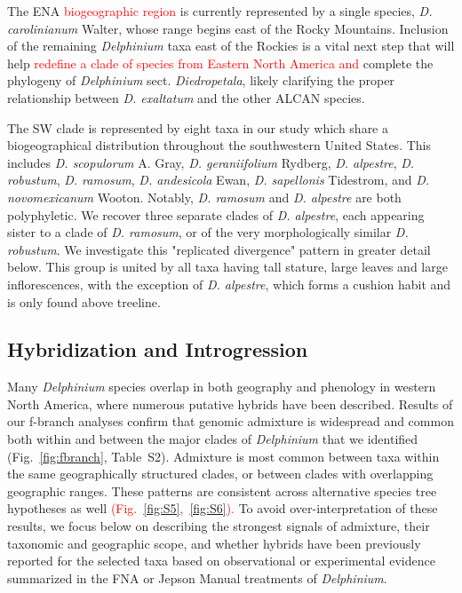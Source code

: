 \documentclass[11pt]{article}
\begin{document}
The ENA \textcolor{red}{biogeographic region} is currently represented by a single species, \emph{D. carolinianum} Walter, whose range begins east of the Rocky Mountains. Inclusion of the remaining \emph{Delphinium} taxa east of the Rockies is a vital next step that will help \textcolor{red}{redefine a clade of species from Eastern North America and} complete the phylogeny of \emph{Delphinium} sect. \emph{Diedropetala}, likely clarifying the proper relationship between \emph{D. exaltatum} and the other ALCAN species.

The SW clade is represented by eight taxa in our study which share a biogeographical
distribution throughout the southwestern United States. This includes
\emph{D. scopulorum} A. Gray, \emph{D. geraniifolium} Rydberg, \emph{D. alpestre},
\emph{D. robustum}, \emph{D. ramosum}, \emph{D. andesicola} Ewan, \emph{D. sapellonis} Tidestrom,
and \emph{D. novomexicanum} Wooton. Notably, \emph{D. ramosum} and \emph{D. alpestre}
are both polyphyletic. We recover three separate clades of \emph{D. alpestre}, each
appearing sister to a clade of \emph{D. ramosum}, or of the very morphologically
similar \emph{D. robustum}. We investigate this "replicated divergence" pattern in 
greater detail below. This group is united by all taxa having tall stature, 
large leaves and large inflorescences, with the exception of \emph{D. alpestre}, which forms a cushion habit and is only found above treeline.



\subsection{Hybridization and Introgression}
Many \emph{Delphinium} species overlap in both geography and phenology in 
western North America, where numerous putative hybrids have been described.
% 
Results of our f-branch analyses confirm that genomic admixture is widespread
and common both within and between the major clades of \emph{Delphinium} that
we identified (Fig.~\ref{fig:fbranch}, Table~S2).
% 
% 
Admixture is most common between taxa within the same geographically structured
clades, or between clades with overlapping geographic ranges.
% 
These patterns are consistent across alternative species tree hypotheses as well 
\textcolor{red}{(Fig.~\ref{fig:S5},~\ref{fig:S6}).}
% 
To avoid over-interpretation of these results, we focus below on describing 
the strongest signals of admixture, their taxonomic and geographic scope, 
and whether hybrids have been previously reported for the selected taxa 
based on observational or experimental evidence summarized in the FNA or 
Jepson Manual treatments of \emph{Delphinium}.
\end{document}
